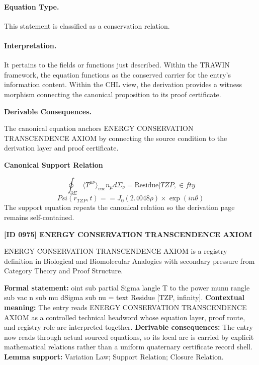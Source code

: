 \paragraph{Equation Type.}
This statement is classified as a conservation relation.

\paragraph{Interpretation.}
It pertains to the fields or functions just described. Within the TRAWIN framework, the equation functions as the conserved carrier for the entry’s information content. Within the CHL view, the derivation provides a witness morphism connecting the canonical proposition to its proof certificate.

\par\vspace{0.35em}
\noindent\textbf{Derivable Consequences.}\quad
\begingroup
\footnotesize
\raggedright
The canonical equation anchors ENERGY CONSERVATION TRANSCENDENCE AXIOM by connecting the source condition to the derivation layer and proof certificate.
\par\endgroup

\noindent\textbf{Canonical Support Relation}\par
\[
\oint_{\partial \Sigma} \langle T^{\mu\nu} \rangle_{vac} n_\mu d\Sigma_\nu = \text{Residue}[TZP, \in fty
\]
\[
Psi(r_{TZP}, t) == J_0(2.4048 \rho) \times \exp(i n \theta)
\]
\noindent The support equation repeats the canonical relation so the derivation page remains self-contained.\par

\clearpage
\noindent\textbf{[ID 0975] ENERGY CONSERVATION TRANSCENDENCE AXIOM}\par
\vspace{0.35em}
\begingroup\small
{}
ENERGY CONSERVATION TRANSCENDENCE AXIOM is a registry definition in Biological and Biomolecular Analogies with secondary pressure from Category Theory and Proof Structure.

\begingroup\footnotesize\setlength{\emergencystretch}{3em}\sloppy
\textbf{Formal statement:} oint sub partial Sigma langle T to the power munu rangle sub vac n sub mu dSigma sub nu = text Residue [TZP, infinity]. \textbf{Contextual meaning:} The entry reads ENERGY CONSERVATION TRANSCENDENCE AXIOM as a controlled technical headword whose equation layer, proof route, and registry role are interpreted together. \textbf{Derivable consequences:} The entry now reads through actual sourced equations, so its local arc is carried by explicit mathematical relations rather than a uniform quaternary certificate record shell. \textbf{Lemma support:} Variation Law; Support Relation; Closure Relation.\par
\endgroup

